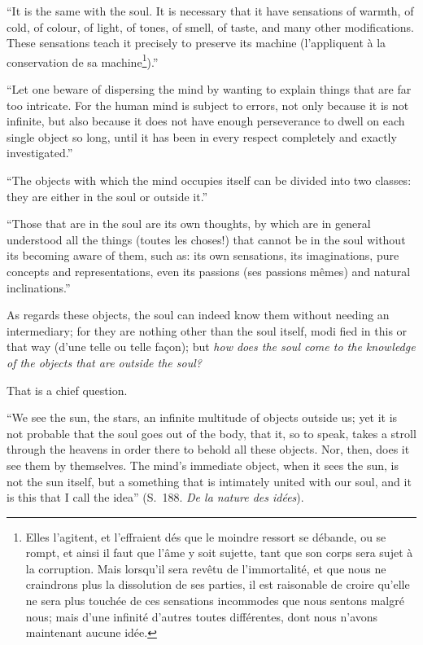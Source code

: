 \documentclass[12pt,a4paper]{article}
\begin{document}
``It is the same with the soul. It is necessary that it have sensations of warmth,
of cold, of colour, of light, of tones, of smell, of taste, and many other
modifications. These sensations teach it precisely to preserve its machine
(l'appliquent à la conservation de sa machine\footnote{Elles l'agitent, et
l'effraient dés que le moindre ressort se débande, ou se rompt, et ainsi il faut
que l'âme y soit sujette, tant que son corps sera sujet à la corruption. Mais
lorsqu'il sera revêtu de l'immortalité, et que nous ne craindrons plus la
dissolution de ses parties, il est raisonable de croire qu'elle ne sera plus
touchée de ces sensations incommodes que nous sentons malgré nous; mais d'une
infinité d'autres toutes différentes, dont nous n'avons maintenant aucune
idée.}).''

``Let one beware of dispersing the mind by wanting to explain things that are far
too intricate. For the human mind is subject to errors, not only because it is not
infinite, but also because it does not have enough perseverance to dwell on each
single object so long, until it has been in every respect completely and exactly
investigated.''

``The objects with which the mind occupies itself can be divided into two classes:
they are either in the soul or outside it.''

``Those that are in the soul are its own thoughts, by which are in general
understood all the things (toutes les choses!) that cannot be in the soul without
its becoming aware of them, such as: its own sensations, its imaginations, pure
concepts and representations, even its passions (ses passions mêmes) and natural
inclinations.''

As regards these objects, the soul can indeed know them without needing an
intermediary; for they are nothing other than the soul itself, modi%
fied in this or that way (d'une telle ou telle façon); but \emph{how does the soul
come to the knowledge of the objects that are outside the soul?}

That is a chief question.

``We see the sun, the stars, an infinite multitude of objects outside us; yet it
is not probable that the soul goes out of the body, that it, so to speak, takes a
stroll through the heavens in order there to behold all these objects. Nor, then,
does it see them by themselves. The mind's immediate object, when it sees the sun,
is not the sun itself, but a something that is intimately united with our soul,
and it is this that I call the idea'' (S.~188. \emph{De la nature des idées}).
\end{document}

